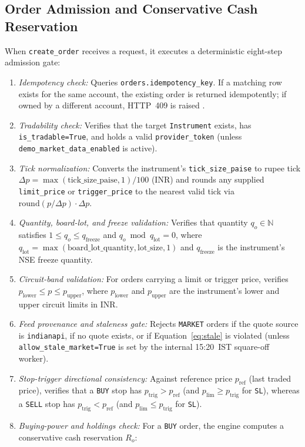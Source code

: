 \documentclass[12pt]{article}
\begin{document}
\subsection{Order Admission and Conservative Cash Reservation}
When \texttt{create\_order} receives a request, it executes a deterministic eight-step admission gate:
\begin{enumerate}
  \item \emph{Idempotency check:} Queries \texttt{orders.idempotency\_key}. If a matching row exists for the same account, the existing order is returned idempotently; if owned by a different account, HTTP~409 is raised \cite{helland2012}.
  \item \emph{Tradability check:} Verifies that the target \texttt{Instrument} exists, has \texttt{is\_tradable=True}, and holds a valid \texttt{provider\_token} (unless \texttt{demo\_market\_data\_enabled} is active).
  \item \emph{Tick normalization:} Converts the instrument's \texttt{tick\_size\_paise} to rupee tick $\Delta p = \max(\text{tick\_size\_paise}, 1)/100$ (INR) and rounds any supplied \texttt{limit\_price} or \texttt{trigger\_price} to the nearest valid tick via $\mathrm{round}(p/\Delta p)\cdot \Delta p$.
  \item \emph{Quantity, board-lot, and freeze validation:} Verifies that quantity $q_o \in \mathbb{N}$ satisfies $1 \le q_o \le q_{\mathrm{freeze}}$ and $q_o \bmod q_{\mathrm{lot}} = 0$, where $q_{\mathrm{lot}} = \max(\text{board\_lot\_quantity}, \text{lot\_size}, 1)$ and $q_{\mathrm{freeze}}$ is the instrument's NSE freeze quantity.
  \item \emph{Circuit-band validation:} For orders carrying a limit or trigger price, verifies $p_{\mathrm{lower}} \le p \le p_{\mathrm{upper}}$, where $p_{\mathrm{lower}}$ and $p_{\mathrm{upper}}$ are the instrument's lower and upper circuit limits in INR.
  \item \emph{Feed provenance and staleness gate:} Rejects \texttt{MARKET} orders if the quote source is \texttt{indianapi}, if no quote exists, or if Equation~\eqref{eq:stale} is violated (unless \texttt{allow\_stale\_market=True} is set by the internal 15:20~IST square-off worker).
  \item \emph{Stop-trigger directional consistency:} Against reference price $p_{\mathrm{ref}}$ (last traded price), verifies that a \texttt{BUY} stop has $p_{\mathrm{trig}} > p_{\mathrm{ref}}$ (and $p_{\mathrm{lim}} \ge p_{\mathrm{trig}}$ for \texttt{SL}), whereas a \texttt{SELL} stop has $p_{\mathrm{trig}} < p_{\mathrm{ref}}$ (and $p_{\mathrm{lim}} \le p_{\mathrm{trig}}$ for \texttt{SL}).
  \item \emph{Buying-power and holdings check:} For a \texttt{BUY} order, the engine computes a conservative cash reservation $R_o$:
\end{enumerate}
\end{document}
